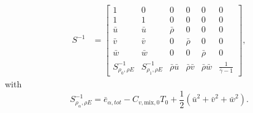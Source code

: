 \begin{align}
S^{-1} &= \left[\begin{array}{cccccc}
  1         & 0         & 0          & 0            & 0            & 0 \\
  1         & 1         & 0          & 0            & 0            & 0 \\
  \bar{u}   & \bar{u}   & \bar{\rho} & 0            & 0            & 0 \\
  \bar{v}   & \bar{v}   & 0          & \bar{\rho}   & 0            & 0 \\
  \bar{w}   & \bar{w}   & 0          & 0            & \bar{\rho}   & 0 \\
  S^{-1}_{\rho_0,\rho E}
& S^{-1}_{\rho_1,\rho E}
& \bar{\rho} \bar{u} 
& \bar{\rho} \bar{v} 
& \bar{\rho} \bar{w} 
& \frac{1}{\bar{\gamma}-1}
\end{array}\right]
,
\end{align}
%
with
%
\begin{equation}
S^{-1}_{\rho_\alpha, \rho E} = 
  \bar{e}_{\alpha,tot} - C_{v,\text{mix},0} T_0  
  + \frac{1}{2} \left( \bar{u}^2 + \bar{v}^2 + \bar{w}^2\right).
\end{equation}


